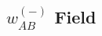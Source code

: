 \documentclass{article}
\begin{document}
  
  
    \subsection{$w_{AB}^{(-)}$ Field}
\end{document}
